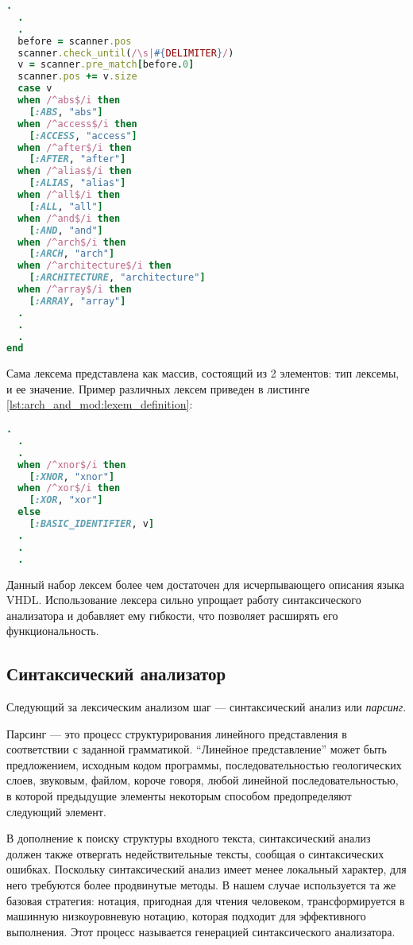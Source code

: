 \begin{lstlisting}[language=Ruby, style=rubystyle,caption={Проверка принадлежности части строки базовой конструкции языка}]
  .
  .
  .
  before = scanner.pos
  scanner.check_until(/\s|#{DELIMITER}/)
  v = scanner.pre_match[before.0]
  scanner.pos += v.size
  case v
  when /^abs$/i then
    [:ABS, "abs"]
  when /^access$/i then
    [:ACCESS, "access"]
  when /^after$/i then
    [:AFTER, "after"]
  when /^alias$/i then
    [:ALIAS, "alias"]
  when /^all$/i then
    [:ALL, "all"]
  when /^and$/i then
    [:AND, "and"]
  when /^arch$/i then
    [:ARCH, "arch"]
  when /^architecture$/i then
    [:ARCHITECTURE, "architecture"]
  when /^array$/i then
    [:ARRAY, "array"]
  .
  .
  .
end
\end{lstlisting}
Сама лексема представлена как массив, состоящий из 2 элементов: тип лексемы, и ее значение. Пример различных лексем приведен в листинге \ref{lst:arch_and_mod:lexem_definition}:
\begin{lstlisting}[language=Ruby, style=rubystyle,caption={Различные типы лексем}, label=lst:arch_and_mod:lexem_definition]
  .
  .
  .
  when /^xnor$/i then
    [:XNOR, "xnor"]
  when /^xor$/i then
    [:XOR, "xor"]
  else
    [:BASIC_IDENTIFIER, v]
  .
  .
  .
\end{lstlisting}

Данный набор лексем более чем достаточен для исчерпывающего описания языка VHDL. Использование лексера сильно упрощает работу синтаксического анализатора и добавляет ему гибкости, что позволяет расширять его функциональность.
\subsection{Синтаксический анализатор}
\label{sub:arch_and_mod:parser}
Следующий за лексическим анализом шаг --- синтаксический анализ или \textit{парсинг}.

Парсинг --- это процесс структурирования линейного представления в соответствии с заданной грамматикой. ``Линейное представление'' может быть предложением, исходным кодом программы, последовательностью геологических слоев, звуковым, файлом, короче говоря, любой линейной последовательностью, в которой предыдущие элементы некоторым способом предопределяют следующий элемент.

В дополнение к поиску структуры входного текста, синтаксический анализ должен также отвергать недействительные тексты, сообщая о синтаксических ошибках. Поскольку синтаксический анализ имеет менее локальный характер, для него требуются более продвинутые методы. В нашем случае используется та же базовая стратегия: нотация, пригодная для чтения человеком, трансформируется в машинную низкоуровневую нотацию, которая подходит для эффективного выполнения. Этот процесс называется генерацией синтаксического анализатора.

